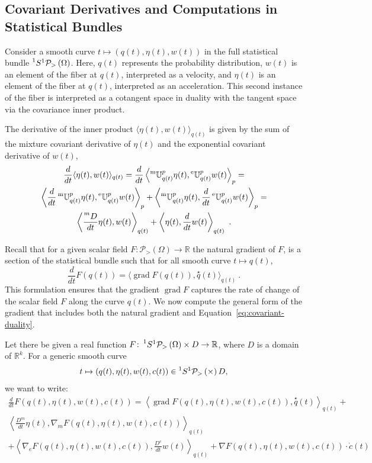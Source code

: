 \documentclass[axioms,article,submit,pdftex,moreauthors]{Definitions/mdpi}
\theoremstyle{plain}
\theoremstyle{remark}
\newcommand{\Grad}{\operatorname{grad}}
\newcommand{\derivby}[1]{\frac{d}{d#1}}
\newcommand{\etransport}[2]{\prescript{\text{e}}{} {\mathbb U} _ {#1} ^ {#2}}
\newcommand{\fullbundleat}[1]{\prescript{1}{}S^1\pdensitieson{#1}}
\newcommand{\mtransport}[2]{\prescript{\text{m}}{} {\mathbb U} _ {#1} ^ {#2}}
\newcommand{\pdensitieson}[1]{\mathcal P_{>}\left(#1\right)}
\newcommand{\reals}{\mathbb{R}}
\newcommand{\scalarat}[3]{\left\langle#2,#3\right\rangle_{#1}}
\newcommand{\mDerivby}[1]{\frac{\prescript{m}{}D}{d#1}}
\begin{document}
\subsection{Covariant Derivatives and Computations in Statistical Bundles}

Consider a smooth curve \( t \mapsto (q(t), \eta(t), w(t)) \) in the full statistical bundle $\fullbundleat\Omega$. Here, \( q(t) \) represents the probability distribution, \( w(t) \) is an element of the fiber at $q(t)$, interpreted as a velocity, and \( \eta(t) \) is an element of the fiber at $q(t)$, interpreted as an acceleration. This second instance of the fiber is interpreted as a cotangent space in duality with the tangent space via the covariance inner product.

The derivative of the inner product \( \langle \eta(t), w(t) \rangle_{q(t)} \) is given by the sum of the mixture covariant derivative of \( \eta(t) \) and the exponential covariant derivative of \( w(t) \),
\begin{multline} \label{eq:covariant-duality} 
\frac{d}{dt} \langle \eta(t), w(t) \rangle_{q(t)} = \derivby t \scalarat p {\mtransport {q(t)}{p} \eta(t)}{\etransport {q(t)}p w(t)} = \\ \scalarat p {\derivby t \mtransport {q(t)}{p} \eta(t)}{\etransport {q(t)}p w(t)} + \scalarat p {\mtransport {q(t)}{p} \eta(t)}{\derivby t \etransport {q(t)}p w(t)} = \\ 
 \scalarat {q(t)} {\mDerivby t \eta(t)}{w(t)} +
 \scalarat {q(t)} {\eta(t)}{\derivby t w(t)} \ .
\end{multline} 

Recall that for a given scalar field \( F \colon \pdensitieson\Omega \to \reals \) the natural gradient of \( F \), is a section of the statistical bundle such that for all smooth curve $t \mapsto q(t)$,
\begin{equation*} 
\frac{d}{dt} F(q(t)) = \langle \Grad F(q(t)), \overset{\star}{q}(t) \rangle_{q(t)} \ .
\end{equation*} 
This formulation ensures that the gradient \( \Grad F \) captures the rate of change of the scalar field \( F \) along the curve \( q(t) \). We now compute the general form of the gradient that includes both the natural gradient and Equation~\eqref{eq:covariant-duality}. 

Let there be given a real function $F \colon \fullbundleat\Omega \times D \to \reals$, where \( D \) is a domain of \( \mathbb{R}^k \). For a generic smooth curve
\begin{equation*} 
t \mapsto (q(t), \eta(t), w(t), c(t)) \in \fullbundleat \times D,
\end{equation*} 
we want to write:
\begin{multline*}  
\frac{d}{dt} F (q(t), \eta(t), w(t), c(t)) =  \left\langle \Grad F (q(t), \eta(t), w(t), c(t)), \overset{\star}{q}(t) \right\rangle_{q(t)} 
+ \\ \left\langle \frac{D^m}{dt} \eta(t), \nabla_m F (q(t), \eta(t), w(t), c(t)) \right\rangle_{q(t)} \\
+ \left\langle \nabla_e F (q(t), \eta(t), w(t), c(t)), \frac{D^e}{dt} w(t) \right\rangle_{q(t)} 
+ \nabla F (q(t), \eta(t), w(t), c(t)) \cdot \dot{c}(t)
\end{multline*}
\end{document}
